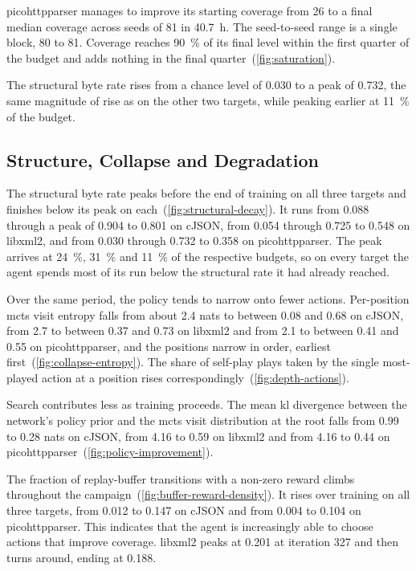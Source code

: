 picohttpparser manages to improve its starting coverage from \num{26} to a
final median coverage across seeds of \num{81} in \SI{40.7}{\hour}.
The seed-to-seed range is a single block, \num{80} to \num{81}.
Coverage reaches \SI{90}{\percent} of its final level within the first quarter of the budget and
adds nothing in the final quarter~(\cref{fig:saturation}).

The structural byte rate rises from a chance level of \num{0.030} to a peak of
\num{0.732}, the same magnitude of rise as on the other two targets, while
peaking earlier at \SI{11}{\percent} of the budget.

\subsection{Structure, Collapse and Degradation}\label{sec:results-degradation}

The structural byte rate peaks before the end of training on all three targets and finishes below
its peak on each~(\cref{fig:structural-decay}).
It runs from \num{0.088} through a peak of \num{0.904} to \num{0.801} on cJSON, from \num{0.054}
through \num{0.725} to \num{0.548} on libxml2, and from \num{0.030} through \num{0.732} to
\num{0.358} on picohttpparser.
The peak arrives at \SI{24}{\percent}, \SI{31}{\percent} and \SI{11}{\percent} of the respective
budgets, so on every target the agent spends most of its run below the structural rate it had
already reached.



Over the same period, the policy tends to narrow onto fewer actions.
Per-position \gls{mcts} visit entropy falls from about \num{2.4} nats to between \num{0.08} and
\num{0.68} on cJSON, from \num{2.7} to between \num{0.37} and \num{0.73} on libxml2 and from
\num{2.1} to between \num{0.41} and \num{0.55} on picohttpparser, and the positions narrow in
order, earliest first~(\cref{fig:collapse-entropy}).
The share of self-play plays taken by the single most-played action at a position rises
correspondingly~(\cref{fig:depth-actions}).



Search contributes less as training proceeds.
The mean \gls{kl} divergence between the network's policy prior and the \gls{mcts} visit distribution at
the root falls from \num{0.99} to \num{0.28} nats on cJSON, from \num{4.16} to \num{0.59} on
libxml2 and from \num{4.16} to \num{0.44} on picohttpparser~(\cref{fig:policy-improvement}).

The fraction of replay-buffer transitions with a non-zero reward climbs throughout the
campaign~(\cref{fig:buffer-reward-density}).
It rises over training on all three targets, from \num{0.012} to \num{0.147} on
cJSON and from \num{0.004} to \num{0.104} on picohttpparser.
This indicates that the agent is increasingly able to choose actions that improve coverage.
libxml2 peaks at \num{0.201} at iteration 327 and then turns around, ending at \num{0.188}.
